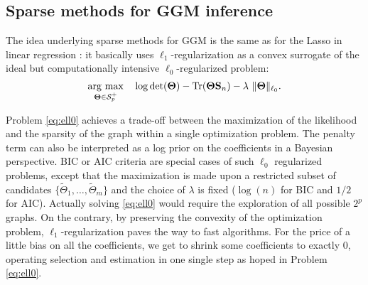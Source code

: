 \subsection{Sparse methods for GGM inference}
\label{sec:sparseGGM}

The idea underlying sparse methods for GGM is the same as for the
Lasso in linear regression \citep{1996_JRSS_Tibshirani}: it basically
uses $\ell_1$-regularization as a convex surrogate of the ideal but
computationally intensive $\ell_0$-regularized problem:
\begin{equation}
  \argmax_{\invcov  \in \mathcal{S}_p^+}\quad
  \log \det(\invcov) - \trace(\invcov \empcov) - \lambda\ 
  \|\invcov\|_{\ell_0}.
  \label{eq:ell0}
\end{equation}

Problem \eqref{eq:ell0} achieves a  trade-off between the maximization
of  the likelihood  and  the sparsity  of the  graph  within a  single
optimization problem.  The  penalty term can also be  interpreted as a
log prior  on the coefficients in  a Bayesian perspective. BIC  or AIC
criteria  are special  cases  of such  $\ell_0$ regularized  problems,
except  that the  maximization is  made  upon a  restricted subset  of
candidates  $\{\tilde{\Theta}_1,\dots,   \tilde{\Theta}_m\}$  and  the
choice of  $\lambda$ is fixed ($\log(n)$  for BIC and $1/2$  for AIC).
Actually solving \eqref{eq:ell0} would  require the exploration of all
possible $2^p$ graphs.   On the contrary, by  preserving the convexity
of the optimization problem,  $\ell_1$-regularization paves the way to
fast  algorithms.   For  the  price  of  a  little  bias  on  all  the
coefficients,  we  get  to  shrink some  coefficients  to  exactly  0,
operating  selection and  estimation in  one single  step as  hoped in
Problem \eqref{eq:ell0}.

